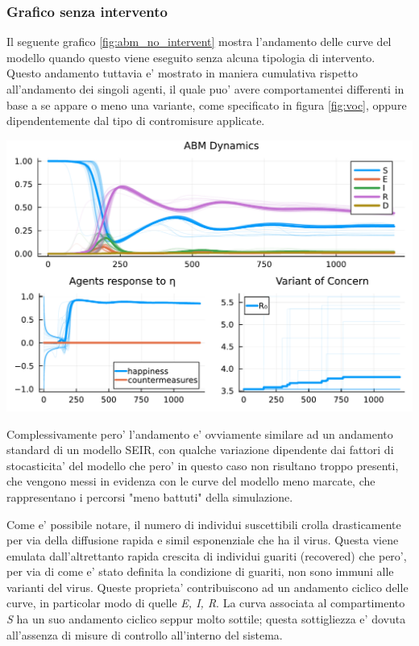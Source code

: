 \subsubsection*{Grafico senza intervento}
Il seguente grafico \ref{fig:abm_no_intervent} mostra l'andamento delle curve del modello
quando questo viene eseguito senza alcuna tipologia di intervento. Questo andamento tuttavia e' mostrato 
in maniera cumulativa rispetto all'andamento dei singoli agenti, il quale puo' avere comportamentei 
differenti in base a se appare o meno una variante, come specificato in figura \ref{fig:voc}, oppure 
dipendentemente dal tipo di contromisure applicate. 

\begin{minipage}{\linewidth}
	\centering
	\includegraphics[width=\textwidth]{img/SocialNetworkABM_NO_CONTROL_2023-07-15.pdf}
	\label{fig:abm_no_intervent}
\end{minipage}

Complessivamente pero' l'andamento e' ovviamente similare ad un andamento standard di un modello 
SEIR, con qualche variazione dipendente dai fattori di stocasticita' del modello che pero'
in questo caso non risultano troppo presenti, che vengono messi in evidenza con le curve del modello 
meno marcate, che rappresentano i percorsi "meno battuti" della simulazione.

Come e' possibile notare, il numero di individui suscettibili crolla drasticamente
per via della diffusione rapida e simil esponenziale che ha il virus. Questa viene emulata
dall'altrettanto rapida crescita di individui guariti (recovered) che pero', per via
di come e' stato definita la condizione di guariti, non sono immuni alle varianti del virus. 
Queste proprieta' contribuiscono ad un andamento ciclico delle curve, in particolar modo 
di quelle \emph{E, I, R}. La curva associata al compartimento \emph{S} ha un suo andamento
ciclico seppur molto sottile; questa sottigliezza e' dovuta all'assenza di misure di 
controllo all'interno del sistema.

